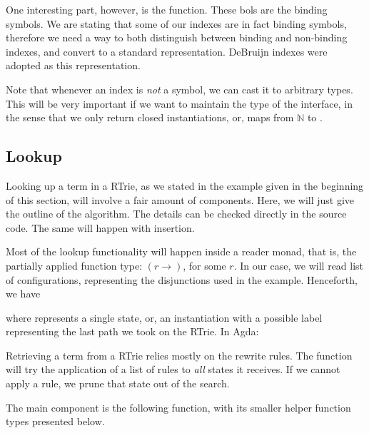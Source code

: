 
One interesting part, however, is the  function. These bols are the binding
symbols. We are stating that some of our indexes are in fact binding symbols, therefore
we need a way to both distinguish between binding and non-binding indexes, and convert
to a standard representation. DeBruijn indexes were adopted as this representation.


Note that whenever an index is \emph{not} a symbol, we can cast it to arbitrary types.
This will be very important if we want to maintain the type of the interface, in the sense
that we only return closed instantiations, or, maps from $\mathbb{N}$ to . 

\subsection{Lookup}

Looking up a term in a RTrie, as we stated in the example given in the beginning of this section,
will involve a fair amount of components. Here, we will just give the outline of the algorithm. The
details can be checked directly in the source code. The same will happen with insertion.

Most of the lookup functionality will happen inside a reader monad, that is, the partially applied function type: $(r \rightarrow)$, for some $r$. In our case, we will read list of configurations,
representing the disjunctions used in the example. Henceforth, we have


where  represents a single state, or, an instantiation with a possible label
representing the last path we took on the RTrie. In Agda:


Retrieving a term from a RTrie relies mostly on the rewrite rules. The  function
will try the application of a list of rules to \emph{all} states it receives. If we cannot apply a rule,
we prune that state out of the search.


The main component is the following function, with its smaller helper function types presented
below.

\\
\\

